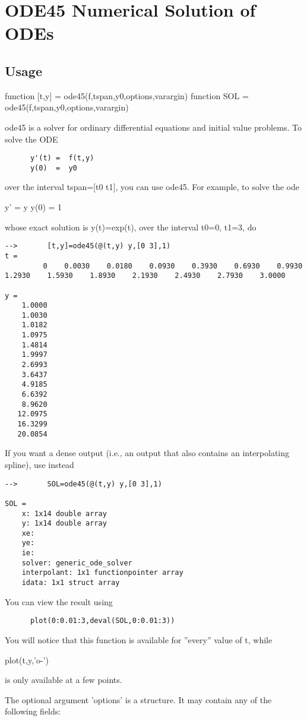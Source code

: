 \section{ODE45 Numerical Solution of ODEs}

\subsection{Usage}

 function [t,y] = ode45(f,tspan,y0,options,varargin)
 function SOL   = ode45(f,tspan,y0,options,varargin)

 ode45 is a solver for ordinary differential equations and initial value problems.
 To solve the ODE
\begin{verbatim}
      y'(t) =  f(t,y)
      y(0)  =  y0
\end{verbatim}
 over the interval tspan=[t0 t1], you can use ode45. For example, to solve
 the ode

      y'   =  y
      y(0) =  1

 whose exact solution is y(t)=exp(t), over the interval t0=0, t1=3, do
\begin{verbatim}
-->       [t,y]=ode45(@(t,y) y,[0 3],1)
t = 
         0    0.0030    0.0180    0.0930    0.3930    0.6930    0.9930    1.2930    1.5930    1.8930    2.1930    2.4930    2.7930    3.0000 

y = 
    1.0000 
    1.0030 
    1.0182 
    1.0975 
    1.4814 
    1.9997 
    2.6993 
    3.6437 
    4.9185 
    6.6392 
    8.9620 
   12.0975 
   16.3299 
   20.0854 
\end{verbatim}
 If you want a dense output (i.e., an output that also contains an interpolating
 spline), use instead
\begin{verbatim}
-->       SOL=ode45(@(t,y) y,[0 3],1)

SOL = 
    x: 1x14 double array
    y: 1x14 double array
    xe: 
    ye: 
    ie: 
    solver: generic_ode_solver
    interpolant: 1x1 functionpointer array
    idata: 1x1 struct array
\end{verbatim}
 You can view the result using
\begin{verbatim}
      plot(0:0.01:3,deval(SOL,0:0.01:3))
\end{verbatim}
 You will notice that this function is available for ''every'' value of t, while

      plot(t,y,'o-')

 is only available at a few points.

 The optional argument 'options' is a structure. It may contain any of the
 following fields:

